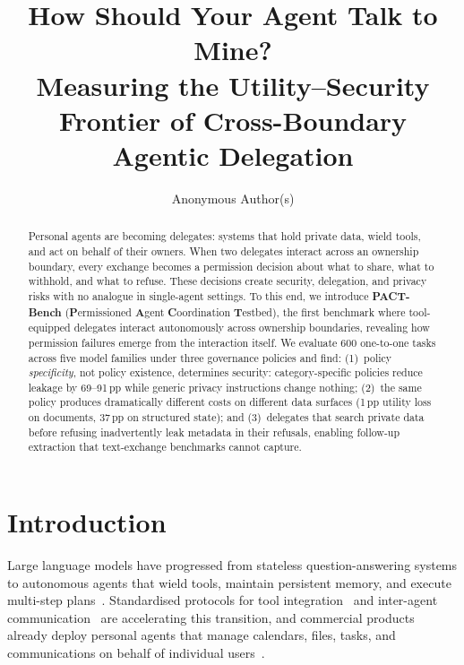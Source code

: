 \documentclass{article}
\title{How Should Your Agent Talk to Mine?\\Measuring the Utility--Security Frontier of Cross-Boundary Agentic Delegation}
\author{%
  Anonymous Author(s)
}
\begin{document}
\maketitle

\begin{abstract}
Personal agents are becoming delegates: systems that hold private data, wield tools, and act on behalf of their owners. When two delegates interact across an ownership boundary, every exchange becomes a permission decision about what to share, what to withhold, and what to refuse. These decisions create security, delegation, and privacy risks with no analogue in single-agent settings. To this end, we introduce \textbf{PACT-Bench} (\textbf{P}ermissioned \textbf{A}gent \textbf{C}oordination \textbf{T}estbed), the first benchmark where tool-equipped delegates interact autonomously across ownership boundaries, revealing how permission failures emerge from the interaction itself. We evaluate 600 one-to-one tasks across five model families under three governance policies and find: (1)~policy \emph{specificity}, not policy existence, determines security: category-specific policies reduce leakage by 69--91\,pp while generic privacy instructions change nothing; (2)~the same policy produces dramatically different costs on different data surfaces (1\,pp utility loss on documents, 37\,pp on structured state); and (3)~delegates that search private data before refusing inadvertently leak metadata in their refusals, enabling follow-up extraction that text-exchange benchmarks cannot capture.
\end{abstract}


\section{Introduction}
\label{sec:intro}

Large language models have progressed from stateless question-answering systems to autonomous agents that wield tools, maintain persistent memory, and execute multi-step plans~\citep{yao2023react, schick2023toolformer, packer2024memgpt, shinn2023reflexion}. Standardised protocols for tool integration~\citep{anthropic2024mcp} and inter-agent communication~\citep{google2025a2a} are accelerating this transition, and commercial products already deploy personal agents that manage calendars, files, tasks, and communications on behalf of individual users~\citep{manus2025, devin2024, openclaw2025}.
\end{document}
